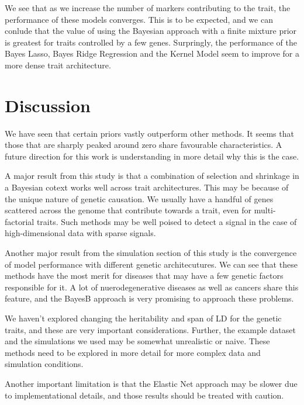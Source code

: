 \documentclass{sig-alternate-05-2015}
\begin{document}
We see that as we increase the number of markers contributing to the trait, the performance of these models converges. This is to be expected, and
we can conlude that the value of using the Bayesian approach with a finite mixture prior is greatest for traits controlled by a few genes. Surpringly, the
performance of the Bayes Lasso, Bayes Ridge Regression and the Kernel Model seem to improve for a more dense trait architecture.

\section{Discussion}

We have seen that certain priors vastly outperform other methods. It seems that those that are sharply peaked around zero share
favourable characteristics. A future direction for this work is understanding in more detail why this is the case.

A major result from this study is that a combination of selection and shrinkage in a Bayesian cotext works well across trait architectures. This may be because of the unique nature of
genetic causation. We usually have a handful of genes scattered across the genome that contribute towards a trait, even for multi-factorial traits. Such methods may be well poised
to detect a signal in the case of high-dimensional data with sparse signals.

Another major result from the simulation section of this study is the convergence of model performance with different genetic architecutures. We can
see that these methods have the most merit for diseases that may have a few genetic factors responsible for it. A lot of nuerodegenerative diseases as
well as cancers share this feature, and the BayesB approach is very promising to approach these problems.

We haven't explored changing the heritability and span of LD for the genetic traits, and these are very important considerations.
Further, the example dataset and the simulations we used may be somewhat unrealistic or naive. These methods need to be explored in more detail
for more complex data and simulation conditions.

Another important limitation is that the Elastic Net approach may be slower due to implementational details, and those results should be treated with
caution.



\end{document}
